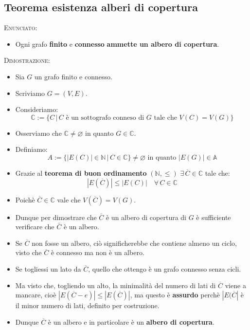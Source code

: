 \documentclass[10pt]{article}
\begin{document}
\subsection{Teorema esistenza alberi di copertura}
\textsc{Enunciato:}
\begin{itemize}
\item
Ogni grafo \textbf{finito} e \textbf{connesso} \textbf{ammette un albero di copertura}.
\end{itemize}
\textsc{Dimostrazione:}
\begin{itemize}
\item
Sia $G$ un grafo finito e connesso.
\item
Scriviamo $G=(V,E)$.
\item
Consideriamo:
$$\mathbb{C} := \{C\,|\,C \textrm{ è un sottografo conneso di } G \textrm{ tale che } V(C) = V(G) \}$$
\item
Osserviamo che $\mathbb{C} \neq \varnothing$ in quanto $G \in \mathbb{C}$.
\item
Definiamo:
$$A := \{|E(C)| \in \mathbb{N} \,|\, C \in \mathbb{C}\} \neq \varnothing \textrm{ in quanto } |E(G)| \in \mathbb{A} $$
\item
Grazie al \textbf{teorema di buon ordinamento} $(\mathbb{N},\leq)\,\, \exists \, \overline{C} \in \mathbb{C}$ tale che:
$$|E(\overline{C})| \leq |E(C)| \quad \forall \, C \in \mathbb{C}$$ 
\item
Poichè $\overline{C} \in \mathbb{C}$ vale che $V(\overline{C}) = V(G)$.
\item
Dunque per dimostrare che $\bar{C}$ è un albero di copertura di $G$ è sufficiente verificare che $\bar{C}$ è un albero.
\item
Se $\overline{C}$ non fosse un albero, ciò significherebbe che contiene almeno un ciclo, visto che $\overline{C}$ è connesso ma non è un albero.
\item
Se togliessi un lato da $\overline{C}$, quello che ottengo è un grafo connesso senza cicli.
\item
Ma visto che, togliendo un alto, la minimalità del numero di lati di $\overline{C}$ viene a mancare, cioè $|E(\overline{C}-e)| \leq |E(\overline{C})|$, ma questo è \textbf{assurdo} perchè $|E(\overline{C}|$ è il minor numero di lati, definito per costruzione.
\item
Dunque $\overline{C}$ è un albero e in particolare è un \textbf{albero di copertura}.
\end{itemize}
\end{document}
